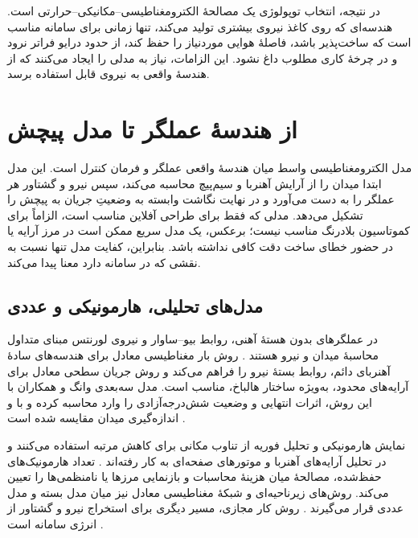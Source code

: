 در نتیجه، انتخاب توپولوژی یک مصالحهٔ الکترومغناطیسی--مکانیکی--حرارتی است. هندسه‌ای که روی کاغذ نیروی بیشتری تولید می‌کند، تنها زمانی برای سامانه مناسب است که ساخت‌پذیر باشد، فاصلهٔ هوایی موردنیاز را حفظ کند، از حدود درایو فراتر نرود و در چرخهٔ کاری مطلوب داغ نشود. این الزامات، نیاز به مدلی را ایجاد می‌کنند که از هندسهٔ واقعی به نیروی قابل استفاده برسد.


\section{از هندسهٔ عملگر تا مدل پیچش}
\label{sec:magnetic_field_force_modeling}

مدل الکترومغناطیسی واسط میان هندسهٔ واقعی عملگر و فرمان کنترل است. این مدل ابتدا میدان را از آرایش آهنربا و سیم‌پیچ محاسبه می‌کند، سپس نیرو و گشتاور هر عملگر را به دست می‌آورد و در نهایت نگاشت وابسته به وضعیتِ جریان به پیچش را تشکیل می‌دهد. مدلی که فقط برای طراحی آفلاین مناسب است، الزاماً برای کموتاسیون بلادرنگ مناسب نیست؛ برعکس، یک مدل سریع ممکن است در مرز آرایه یا در حضور خطای ساخت دقت کافی نداشته باشد. بنابراین، کفایت مدل تنها نسبت به نقشی که در سامانه دارد معنا پیدا می‌کند.

\subsection{مدل‌های تحلیلی، هارمونیکی و عددی}
\label{subsec:electromagnetic_modeling_methods}

در عملگرهای بدون هستهٔ آهنی، روابط بیو--ساوار و نیروی لورنتس مبنای متداول محاسبهٔ میدان و نیرو هستند \cite{deboeijModelingIronlessPermanent2006,jansenModelingMagneticallyLevitated2007}. روش بار مغناطیسی معادل برای هندسه‌های سادهٔ آهنربای دائم، روابط بستهٔ نیرو را فراهم می‌کند \cite{akoun3DAnalyticalCalculation1984,yangFieldAnalysisLevitation2026d} و روش جریان سطحی معادل برای آرایه‌های محدود، به‌ویژه ساختار هالباخ، مناسب است. مدل سه‌بعدی وانگ و همکاران با این روش، اثرات انتهایی و وضعیت شش‌درجه‌آزادی را وارد محاسبه کرده و با  و اندازه‌گیری میدان مقایسه شده است \cite{wangThreedimensionalElectromagneticAnalytical2025}.

نمایش هارمونیکی و تحلیل فوریه از تناوب مکانی برای کاهش مرتبه استفاده می‌کنند و در تحلیل آرایه‌های آهنربا و موتورهای صفحه‌ای به کار رفته‌اند \cite{wangMagnetArrayPlanar2020,jansenModelingMagneticallyLevitated2007}. تعداد هارمونیک‌های حفظ‌شده، مصالحهٔ میان هزینهٔ محاسبات و بازنمایی مرزها یا نامنظمی‌ها را تعیین می‌کند. روش‌های زیرناحیه‌ای و شبکهٔ مغناطیسی معادل نیز میان مدل بسته و مدل عددی قرار می‌گیرند \cite{liElectromagneticAnalysisAxialflux2024,wangElectromagneticPerformanceAnalysis2026,zhangNumericalModelingStructure2025}. روش کار مجازی، مسیر دیگری برای استخراج نیرو و گشتاور از انرژی سامانه است \cite{deboeijModelingIronlessPermanent2006}.

